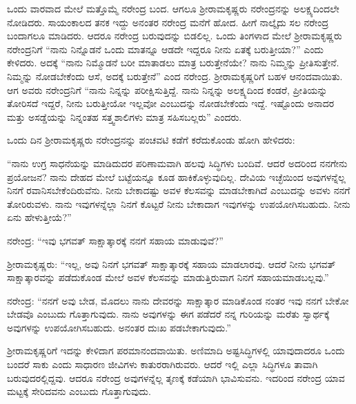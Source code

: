 ಒಂದು ವಾರವಾದ ಮೇಲೆ ಮತ್ತೊಮ್ಮೆ ನರೇಂದ್ರ ಬಂದ. ಆಗಲೂ ಶ‍್ರೀರಾಮಕೃಷ್ಣರು ನರೇಂದ್ರನನ್ನು ಅಲಕ್ಷ್ಯದಿಂದಲೇ ನೋಡಿದರು. ಸಾಯಂಕಾಲದ ತನಕ ಇದ್ದು ಅನಂತರ ನರೇಂದ್ರ ಮನೆಗೆ ಹೋದ. ಹೀಗೆ ನಾಲ್ಕೈದು ಸಲ ನರೇಂದ್ರ ಬಂದಾಗಲೂ ಮಾಡಿದರು. ಆದರೂ ನರೇಂದ್ರ ಬರುವುದನ್ನು ಬಿಡಲಿಲ್ಲ. ಒಂದು ತಿಂಗಳಾದ ಮೇಲೆ ಶ‍್ರೀರಾಮಕೃಷ್ಣರು ನರೇಂದ್ರನಿಗೆ “ನಾನು ನಿನ್ನೊಡನೆ ಒಂದು ಮಾತನ್ನೂ ಆಡದೇ ಇದ್ದರೂ ನೀನು ಏತಕ್ಕೆ ಬರುತ್ತೀಯಾ?” ಎಂದು ಕೇಳಿದರು. ಅದಕ್ಕೆ “ನಾನು ನಿಮ್ಮೊಡನೆ ಬರೀ ಮಾತಾಡಲು ಮಾತ್ರ ಬರುತ್ತೇನೆಯೇ? ನಾನು ನಿಮ್ಮನ್ನು ಪ್ರೀತಿಸುತ್ತೇನೆ. ನಿಮ್ಮನ್ನು ನೋಡಬೇಕೆಂದು ಆಸೆ, ಅದಕ್ಕೆ ಬರುತ್ತೇನೆ” ಎಂದ ನರೇಂದ್ರ. ಶ‍್ರೀರಾಮಕೃಷ್ಣರಿಗೆ ಬಹಳ ಆನಂದವಾಯಿತು. ಆಗ ಅವರು ನರೇಂದ್ರನಿಗೆ “ನಾನು ನಿನ್ನನ್ನು ಪರೀಕ್ಷಿಸುತ್ತಿದ್ದೆ. ನಾನು ನಿನ್ನನ್ನು ಅಲಕ್ಷ್ಯದಿಂದ ಕಂಡರೆ, ಪ್ರೀತಿಯನ್ನು ತೋರಿಸದೆ ಇದ್ದರೆ, ನೀನು ಬರುತ್ತೀಯೋ ಇಲ್ಲವೋ ಎಂಬುದನ್ನು ನೋಡಬೇಕೆಂದು ಇದ್ದೆ. ಇಷ್ಟೊಂದು ಅನಾದರ ಮತ್ತು ಅಸಡ್ಡೆಯನ್ನು ನಿನ್ನಂತಹ ಸತ್ತ್ವಶಾಲಿಗಳು ಮಾತ್ರ ಸಹಿಸಬಲ್ಲರು” ಎಂದರು.

ಒಂದು ದಿನ ಶ‍್ರೀರಾಮಕೃಷ್ಣರು ನರೇಂದ್ರನನ್ನು ಪಂಚವಟಿ ಕಡೆಗೆ ಕರೆದುಕೊಂಡು ಹೋಗಿ ಹೇಳಿದರು:

“ನಾನು ಉಗ್ರ ಸಾಧನೆಯನ್ನು ಮಾಡಿದುದರ ಪರಿಣಾಮವಾಗಿ ಹಲವು ಸಿದ್ಧಿಗಳು ಬಂದಿವೆ. ಆದರೆ ಅದರಿಂದ ನನಗೇನು ಪ್ರಯೋಜನ? ನಾನು ದೇಹದ ಮೇಲೆ ಬಟ್ಟೆಯನ್ನೂ ಕೂಡ ಹಾಕಿಕೊಳ್ಳುವುದಿಲ್ಲ. ದೇವಿಯ ಇಚ್ಛೆಯಿಂದ ಅವುಗಳನ್ನೆಲ್ಲ ನಿನಗೆ ರವಾನಿಸಬೇಕೆಂದಿರುವೆನು. ನೀನು ಬೇಕಾದಷ್ಟು ಅವಳ ಕೆಲಸವನ್ನು ಮಾಡಬೇಕಾಗಿದೆ ಎಂಬುದನ್ನು ಅವಳು ನನಗೆ ತೋರಿರುವಳು. ನಾನು ಇವುಗಳನ್ನೆಲ್ಲಾ ನಿನಗೆ ಕೊಟ್ಟರೆ ನೀನು ಬೇಕಾದಾಗ ಇವುಗಳನ್ನು ಉಪಯೋಗಿಸಬಹುದು. ನೀನು ಏನು ಹೇಳುತ್ತೀಯೆ?”

ನರೇಂದ್ರ: “ಇವು ಭಗವತ್ ಸಾಕ್ಷಾತ್ಕಾರಕ್ಕೆ ನನಗೆ ಸಹಾಯ ಮಾಡುವುವೆ?”

ಶ‍್ರೀರಾಮಕೃಷ್ಣರು: “ಇಲ್ಲ, ಅವು ನಿನಗೆ ಭಗವತ್ ಸಾಕ್ಷಾತ್ಕಾರಕ್ಕೆ ಸಹಾಯ ಮಾಡಲಾರವು. ಆದರೆ ನೀನು ಭಗವತ್ ಸಾಕ್ಷಾತ್ಕಾರವನ್ನು ಪಡೆದುಕೊಂಡ ಮೇಲೆ ಅವಳ ಕೆಲಸವನ್ನು ಮಾಡುತ್ತಿರುವಾಗ ನಿನಗೆ ಸಹಾಯಮಾಡಬಲ್ಲವು.”

ನರೇಂದ್ರ: “ನನಗೆ ಅವು ಬೇಡ, ಮೊದಲು ನಾನು ದೇವರನ್ನು ಸಾಕ್ಷಾತ್ಕಾರ ಮಾಡಿಕೊಂಡ ನಂತರ ಇವು ನನಗೆ ಬೇಕೋ ಬೇಡವೊ ಎಂಬುದು ಗೊತ್ತಾಗುವುದು. ನಾನು ಅವುಗಳನ್ನು ಈಗ ಪಡೆದರೆ ನನ್ನ ಗುರಿಯನ್ನು ಮರೆತು ಸ್ವಾರ್ಥಕ್ಕೆ ಅವುಗಳನ್ನು ಉಪಯೋಗಿಸಬಹುದು. ಅನಂತರ ದುಃಖ ಪಡಬೇಕಾಗುವುದು.”

\newpage

ಶ‍್ರೀರಾಮಕೃಷ್ಣರಿಗೆ ಇದನ್ನು ಕೇಳಿದಾಗ ಪರಮಾನಂದವಾಯಿತು. ಅಣಿಮಾದಿ ಅಷ್ಟಸಿದ್ಧಿಗಳಲ್ಲಿ ಯಾವುದಾದರೂ ಒಂದು ಬಂದರೆ ಸಾಕು ಎಂದು ಸಾಧಾರಣ ಜೀವಿಗಳು ಕಾತುರರಾಗಿರುವರು. ಆದರೆ ಇಲ್ಲಿ ಎಲ್ಲಾ ಸಿದ್ಧಿಗಳೂ ತಾವಾಗಿ ಬರುವುದರಲ್ಲಿದ್ದವು. ಆದರೂ ನರೇಂದ್ರ ಅವುಗಳನ್ನೆಲ್ಲ ತೃಣಕ್ಕೆ ಕಡೆಯಾಗಿ ಭಾವಿಸುವನು. ಇದರಿಂದ ನರೇಂದ್ರ ಯಾವ ಮಟ್ಟಕ್ಕೆ ಸೇರಿದವನು ಎಂಬುದು ಗೊತ್ತಾಗುವುದು.

